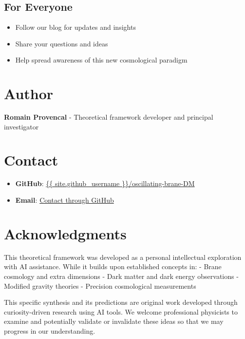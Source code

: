 \documentclass[
  11pt,
]{report}
\providecommand{\tightlist}{%
  \setlength{\itemsep}{0pt}\setlength{\parskip}{0pt}}
\begin{document}
\subsection{For Everyone}\label{for-everyone}

\begin{itemize}
\tightlist
\item
  Follow our blog for updates and insights
\item
  Share your questions and ideas
\item
  Help spread awareness of this new cosmological paradigm
\end{itemize}

\section{Author}\label{author}

\textbf{Romain Provencal} - Theoretical framework developer and
principal investigator

\section{Contact}\label{contact}

\begin{itemize}
\tightlist
\item
  \textbf{GitHub}:
  \href{https://github.com/\%7B\%7B\%20site.github_username\%20\%7D\%7D/oscillating-brane-DM}{\{\{
  site.github\_username \}\}/oscillating-brane-DM}
\item
  \textbf{Email}:
  \href{https://github.com/\%7B\%7B\%20site.github_username\%20\%7D\%7D}{Contact
  through GitHub}
\end{itemize}

\section{Acknowledgments}\label{acknowledgments}

This theoretical framework was developed as a personal intellectual
exploration with AI assistance. While it builds upon established
concepts in: - Brane cosmology and extra dimensions - Dark matter and
dark energy observations - Modified gravity theories - Precision
cosmological measurements

This specific synthesis and its predictions are original work developed
through curiosity-driven research using AI tools. We welcome
professional physicists to examine and potentially validate or
invalidate these ideas so that we may progress in our understanding.
\end{document}
